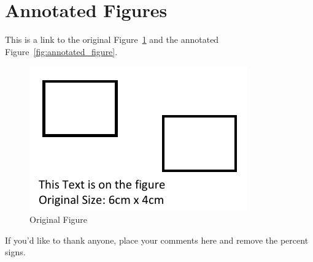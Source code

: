 \documentclass[natbib,table]{svjour3}                     %
\begin{document}
\section{Annotated Figures}
This is a link to the original Figure~\ref{fig:figure} and the annotated Figure~\ref{fig:annotated_figure}.
%
\begin{figure}
\includegraphics[trim={0 0cm 0 0cm},clip]{../_shared/figure6x4.pdf}
\caption{Original Figure}\label{fig:figure}
\end{figure}
%

%
\blindtext[1]

\begin{acknowledgements}
If you'd like to thank anyone, place your comments here and remove the percent signs.
\end{acknowledgements}

\end{document}
